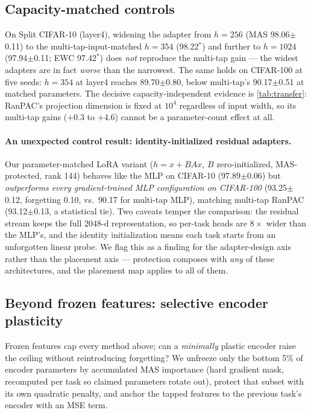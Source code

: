 \documentclass{article} %
\begin{document}
\subsection{Capacity-matched controls}
\label{sec:capacity}
On Split CIFAR-10 (layer4), widening the adapter from $h{=}256$ (MAS
98.06$\pm$0.11) to the multi-tap-input-matched $h{=}354$ (98.22$^*$) and
further to $h{=}1024$ (97.94$\pm$0.11; EWC 97.42$^*$) does \emph{not}
reproduce the multi-tap gain --- the widest adapters are in fact \emph{worse}
than the narrowest. The same holds on CIFAR-100 at five seeds: $h{=}354$ at
layer4 reaches 89.70$\pm$0.80, below multi-tap's 90.17$\pm$0.51 at matched
parameters. The decisive capacity-independent evidence is \cref{tab:transfer}:
RanPAC's projection dimension is fixed at $10^4$ regardless of input width, so
its multi-tap gains ($+0.3$ to $+4.6$) cannot be a parameter-count effect at
all.

\paragraph{An unexpected control result: identity-initialized residual
adapters.} Our parameter-matched LoRA variant ($h = x + BAx$, $B$
zero-initialized, MAS-protected, rank 144) behaves like the MLP on CIFAR-10
(97.89$\pm$0.06) but \emph{outperforms every gradient-trained MLP
configuration on CIFAR-100} (93.25$\pm$0.12, forgetting 0.10, vs.\ 90.17 for
multi-tap MLP), matching multi-tap RanPAC (93.12$\pm$0.13, a statistical tie).
Two caveats
temper the comparison: the residual stream keeps the full 2048-d
representation, so per-task heads are $8\times$ wider than the MLP's, and the
identity initialization means each task starts from an unforgotten linear
probe. We flag this as a finding for the adapter-design axis rather than the
placement axis --- protection composes with \emph{any} of these architectures,
and the placement map applies to all of them.

\subsection{Beyond frozen features: selective encoder plasticity}
\label{sec:beyond}
Frozen features cap every method above; can a \emph{minimally} plastic encoder
raise the ceiling without reintroducing forgetting? We unfreeze only the
bottom 5\% of encoder parameters by accumulated MAS importance (hard gradient
mask, recomputed per task so claimed parameters rotate out), protect that
subset with its own quadratic penalty, and anchor the tapped features to the
previous task's encoder with an MSE term.
\end{document}
